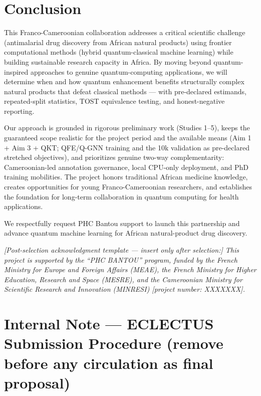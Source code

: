 \documentclass[11pt,a4paper]{article}
\begin{document}
\section{Conclusion}

This Franco-Cameroonian collaboration addresses a critical scientific challenge (antimalarial drug discovery from African natural products) using frontier computational methods (hybrid quantum-classical machine learning) while building sustainable research capacity in Africa. By moving beyond quantum-inspired approaches to genuine quantum-computing applications, we will determine when and how quantum enhancement benefits structurally complex natural products that defeat classical methods --- with pre-declared estimands, repeated-split statistics, TOST equivalence testing, and honest-negative reporting.

Our approach is grounded in rigorous preliminary work (Studies 1--5), keeps the guaranteed scope realistic for the project period and the available means (Aim 1 + Aim 3 + QKT; QFE/Q-GNN training and the 10k validation as pre-declared stretched objectives), and prioritizes genuine two-way complementarity: Cameroonian-led annotation governance, local CPU-only deployment, and PhD training mobilities. The project honors traditional African medicine knowledge, creates opportunities for young Franco-Cameroonian researchers, and establishes the foundation for long-term collaboration in quantum computing for health applications.

We respectfully request PHC Bantou support to launch this partnership and advance quantum machine learning for African natural-product drug discovery.

\vspace{1em}
\noindent\textit{[Post-selection acknowledgment template --- insert only after selection:] This project is supported by the ``PHC BANTOU'' program, funded by the French Ministry for Europe and Foreign Affairs (MEAE), the French Ministry for Higher Education, Research and Space (MESRE), and the Cameroonian Ministry for Scientific Research and Innovation (MINRESI) [project number: XXXXXXX].}

\clearpage

\section*{Internal Note --- ECLECTUS Submission Procedure (remove before any circulation as final proposal)}
\end{document}
